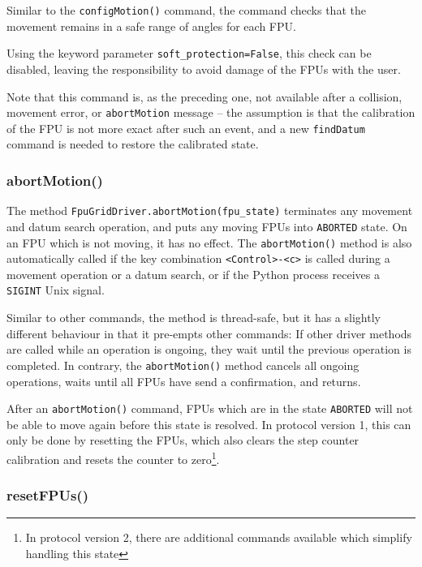 \documentclass[11pt,a4paper]{report}
\begin{document}
Similar to the \texttt{configMotion()} command, the command checks
that the movement remains in a safe range of angles for each
FPU.

Using the keyword parameter \texttt{soft\_protection=False}, this
check can be disabled, leaving the responsibility to avoid damage of
the FPUs with the user.

Note that this command is, as the preceding one, not available after a
collision, movement error, or \texttt{abortMotion} message -- the
assumption is that the calibration of the FPU is not more exact after
such an event, and a new \texttt{findDatum} command is needed to
restore the calibrated state.


\subsubsection{abortMotion()}


\begin{sloppypar}
The method \texttt{FpuGridDriver.abortMotion(fpu\_state)} terminates
any movement and datum search operation, and puts any moving FPUs into
\texttt{ABORTED} state. On an FPU which is not moving, it has no
effect.  The \texttt{abortMotion()} method is also automatically
called if the key combination \verb+<Control>-<c>+ is called during a
movement operation or a datum search, or if the Python process
receives a \texttt{SIGINT} Unix signal.
\end{sloppypar}

Similar to other commands, the method is thread-safe, but it has a
slightly different behaviour in that it pre-empts other commands: If
other driver methods are called while an operation is ongoing, they
wait until the previous operation is completed. In contrary, the
\texttt{abortMotion()} method cancels all ongoing operations, waits
until all FPUs have send a confirmation, and returns.

After an \texttt{abortMotion()} command, FPUs which are in the state
\texttt{ABORTED} will not be able to move again before this state is
resolved. In protocol version 1, this can only be done by resetting
the FPUs, which also clears the step counter calibration and resets
the counter to zero\footnote{In protocol version 2, there are
  additional commands available which simplify handling this state}.


\subsubsection{resetFPUs()}
\end{document}
